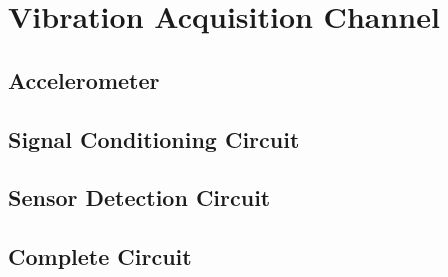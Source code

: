 \section{Vibration Acquisition Channel}\label{sec:vibration-acquisition-channel}

\subsection{Accelerometer}\label{ssec:accelerometer-signal}

\subsection{Signal Conditioning Circuit}\label{ssec:accelerometer-signal-conditioning-circuit}

\subsection{Sensor Detection Circuit}\label{ssec:accelerometer-sensor-detection-circuit}

\subsection{Complete Circuit}\label{ssec:accelerometer-complete-circuit}
